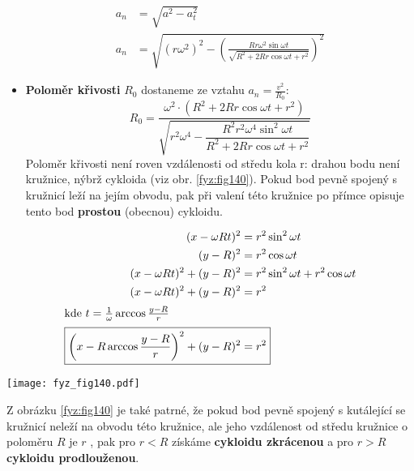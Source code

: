 \begin{example}
\begin{itemize}
      \begin{align*}
        a_n &= \sqrt{a^2 - a_t^2}                                                 \\
        a_n &= \sqrt{(r\omega^2)^2-\left(
               \frac{Rr\omega^2\sin\omega t}
                    {\sqrt{R^2 + 2Rr\cos\omega t + r^2}}\right)^2}
      \end{align*}
    \item \textbf{Poloměr křivosti} $R_0$ dostaneme ze vztahu $a_n=\frac{v^2}{R_0}$:
      \begin{equation*}
          R_0 =  \dfrac{\omega^2\cdot(R^2 + 2Rr\cos\omega t + r^2)}{\sqrt{r^2\omega^4 - 
                   \dfrac{R^2r^2\omega^4\sin^2\omega t}{R^2 + 2Rr\cos\omega t + r^2}}}
      \end{equation*}
      Poloměr křivosti není roven vzdálenosti od středu kola r: drahou bodu není kružnice, nýbrž 
      cykloida (viz obr. \ref{fyz:fig140}). Pokud bod pevně spojený s kružnicí leží na 
      jejím obvodu, pak při valení této kružnice po přímce opisuje tento bod \textbf{prostou} 
      (obecnou) cykloidu. 
  \end{itemize}
  
  \begin{align*}
    (x - \omega R t)^2            &= r^2\sin^2\omega t                          \\
    (y-R)^2                       &= r^2\cos\omega t                            \\
    (x - \omega R t)^2 + (y-R)^2  &= r^2\sin^2\omega t + r^2\cos\omega t        \\
    (x - \omega R t)^2 + (y-R)^2  &= r^2 \quad                                  \\
    \shortintertext{kde \(t = \frac{1}{\omega}\arccos\frac{y-R}{r}\)}
    \Aboxed{\left(x - R\arccos\frac{y-R}{r}\right)^2 + (y-R)^2  &= r^2}
  \end{align*}

   {\centering
    \captionsetup{type=figure}
    \texttt{[image: fyz\_fig140.pdf]}
%   
    \label{fyz:fig140}
    \par}       
    \vspace{1em}
   
   Z obrázku \ref{fyz:fig140} je také patrné, že pokud bod pevně spojený s kutálející se kružnicí 
   neleží na obvodu této kružnice, ale jeho vzdálenost od středu kružnice o poloměru \(R\)  je 
   \(r\) , pak pro \(r<R\) získáme \textbf{cykloidu zkrácenou} a pro \(r>R\)  \textbf{cykloidu 
   prodlouženou}.
      

\end{example}
